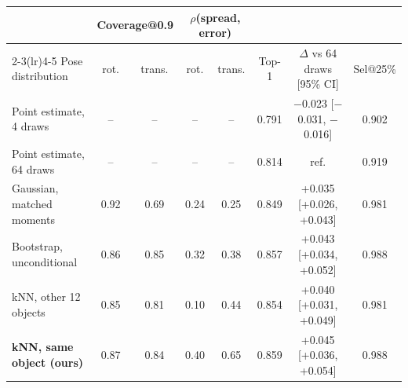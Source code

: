 \begin{tabular}{lccccccc}
\toprule
 & \multicolumn{2}{c}{Coverage@0.9} & \multicolumn{2}{c}{$\rho$(spread, error)} & & & \\
\cmidrule(lr){2-3}\cmidrule(lr){4-5}
Pose distribution & rot. & trans. & rot. & trans. & Top-1 & $\Delta$ vs 64 draws [95\% CI] & Sel@25\%\\
\midrule
Point estimate, 4 draws & -- & -- & -- & -- & 0.791 & $-$0.023 [$-$0.031, $-$0.016] & 0.902\\
Point estimate, 64 draws & -- & -- & -- & -- & 0.814 & ref. & 0.919\\
Gaussian, matched moments & 0.92 & 0.69 & 0.24 & 0.25 & 0.849 & +0.035 [+0.026, +0.043] & 0.981\\
Bootstrap, unconditional & 0.86 & 0.85 & 0.32 & 0.38 & 0.857 & +0.043 [+0.034, +0.052] & 0.988\\
kNN, other 12 objects & 0.85 & 0.81 & 0.10 & 0.44 & 0.854 & +0.040 [+0.031, +0.049] & 0.981\\
\rowcolor{oursrow}\textbf{kNN, same object (ours)} & 0.87 & 0.84 & 0.40 & 0.65 & 0.859 & +0.045 [+0.036, +0.054] & 0.988\\
\bottomrule
\end{tabular}
